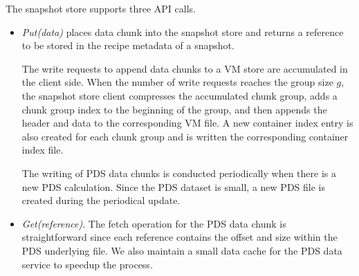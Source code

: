 
The snapshot  store supports three API calls.
\begin{itemize}

\item {\em Put(data)} places data chunk into the snapshot store and returns a reference to be stored in 
the recipe metadata of a snapshot. 

The write requests to append data chunks to a VM store are accumulated in the client side. 
When the number of write requests reaches the group size $g$, the snapshot store client compresses
the accumulated   chunk group, adds a chunk group index  to the beginning of the group, and then
appends the header and data  to the corresponding VM file.
A new container  index entry is also created for each chunk group and is written the corresponding
container index file.

The writing of PDS data chunks is conducted periodically when there is a new PDS calculation.
Since the PDS dataset is small, a new PDS file is created during the periodical update.
\item{\em Get(reference)}.
The fetch operation for the PDS data chunk is straightforward since each reference contains 
the offset and size within the PDS  underlying  file.
We also maintain a small data cache for the PDS data service to speedup the process.


\end{itemize}
